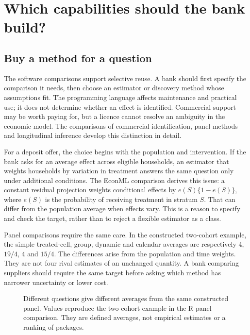 \chapter{Which capabilities should the bank build?}
\label{reading:software-conclusions}

\section{Buy a method for a question}

The software comparisons support selective reuse. A bank should first specify
the comparison it needs, then choose an estimator or discovery method whose
assumptions fit. The programming language affects maintenance and practical
use; it does not determine whether an effect is identified. Commercial support
may be worth paying for, but a licence cannot resolve an ambiguity in the
economic model. The comparisons of commercial identification, panel methods
and longitudinal inference develop this distinction in detail.

For a deposit offer, the choice begins with the population and intervention.
If the bank asks for an average effect across eligible households, an estimator
that weights households by variation in treatment answers the same question
only under additional conditions. The EconML comparison derives this issue:
a constant residual projection weights conditional effects by
$e(S)\{1-e(S)\}$, where $e(S)$ is the probability of receiving treatment in
stratum $S$. That can differ from the population average when effects vary.
This is a reason to specify and check the target, rather than to reject a
flexible estimator as a class.~\citep{exec19_econml_source,exec19_econml_reference}

Panel comparisons require the same care. In the constructed two-cohort example,
the simple treated-cell, group, dynamic and calendar averages are respectively
$4$, $19/4$, $4$ and $15/4$. The differences arise from the population and time
weights. They are not four rival estimates of an unchanged quantity. A bank
comparing suppliers should require the same target before asking which method
has narrower uncertainty or lower cost.~\citep{exec24_panelr_did,exec24_panelr_contract}

\begin{figure}[htbp]\centering
{}
\caption{Different questions give different averages from the same constructed
panel. Values reproduce the two-cohort example in the R panel comparison.
They are defined averages, not empirical estimates or a ranking of packages.
\citep{exec24_panelr_contract}}
\label{reading:panel-averages}
\end{figure}

